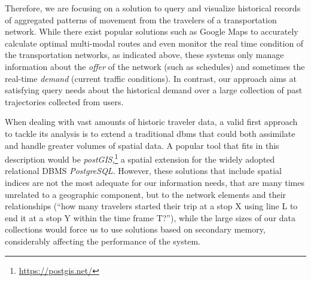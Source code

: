     
    
    Therefore, we are focusing on a solution to query and visualize historical records of aggregated patterns of movement from the travelers of a transportation network. While there exist popular solutions such as Google Maps to accurately calculate optimal multi-modal routes and even monitor the real time condition of the transportation networks, as indicated above, these systems only manage information about the {\em offer} of the network (such as schedules) and sometimes the real-time {\em demand} (current traffic conditions). In contrast, our approach aims at satisfying query needs about the historical demand over a large collection of past trajectories collected from users.
    
    
    
    When dealing with vast amounts of historic traveler data, a valid first approach to tackle its analysis is to extend a traditional \gls{dbms} that could both assimilate and handle greater volumes of spatial data. A popular tool that fits in this description would be \textit{postGIS},\footnote{\url{https://postgis.net/}} a spatial extension for the widely adopted relational DBMS \textit{PostgreSQL}. 
    However, these solutions that include spatial indices are not the most adequate for our information needs, that are many times unrelated to a geographic component, but to the network elements and their relationships (``how many travelers started their trip at a stop X using line L to end it at a stop Y within the time frame T?''), while the large sizes of our data collections would force us to use solutions based on secondary memory, considerably affecting the performance of the system.
    
